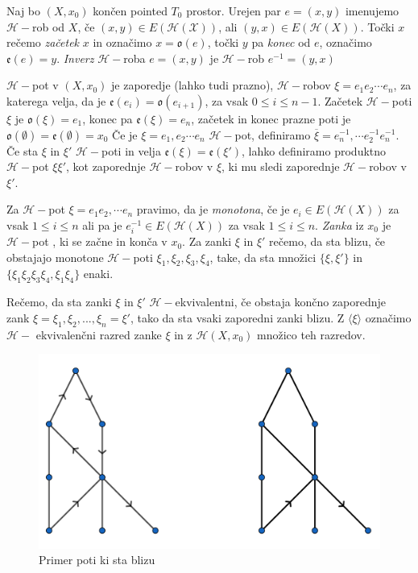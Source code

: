 \documentclass[mat1]{fmfdelo}
\DeclareRobustCommand{\h}{
    \mathcal{H}
}
\DeclareRobustCommand{\pot}{
    $\h-$pot
}
\begin{document}
\begin{definicija}
    Naj bo $(X,x_0)$ končen pointed $T_0$ prostor. Urejen par 
$e=(x,y)$ imenujemo $\mathcal{H}-$rob od $X$, če $(x,y)\in 
E(\mathcal{H}(\mathcal{X}))$, ali $(y,x)\in 
E(\h(X))$. Točki $x$ rečemo \textit{začetek} $x$ in označimo 
$x=\mathfrak{o}(e)$, točki $y$ pa \textit{konec} od $e$, 
označimo $\mathfrak{e}(e)=y$. \textit{Inverz} $\h-$roba $e=(x,y)$ je $\h-$rob $e^{-1}=(y,x)$

$\h-$pot v $(X,x_0)$ je zaporedje (lahko tudi prazno), $\h-$robov $\xi=e_1e_2\cdots e_n$, 
za katerega velja, da je $\mathfrak{e}(e_i)=\mathfrak{o}(e_{i+1})$, za vsak $0\leq i \leq n-1$.
 Začetek $\h-$poti $\xi$ je  $\mathfrak{o}(\xi)=e_1$, konec pa $\mathfrak{e}(\xi)=e_n$, 
 začetek in konec prazne poti je $\mathfrak{o}(\emptyset)=\mathfrak{e}(\emptyset)=x_0$
 Če je $\xi=e_1,e_2\cdots e_n$ $\h-$pot, definiramo $\overline{\xi}=e_n^{-1},\cdots 
 e_2^{-1}e_n^{-1}$. Če sta $\xi$ in $\xi'$ $\h-$poti in velja $\mathfrak{e}(\xi)=
 \mathfrak{e}(\xi')$, lahko definiramo produktno \pot $\xi\xi'$, kot zaporednje 
 $\h-$robov v $\xi$, ki mu sledi zaporednje $\h-$robov v $\xi'$.

 Za \pot $\xi=e_1e_2,\cdots e_n$ pravimo, da je \textit{monotona}, če je $e_i\in 
 E(\h(X))$ za vsak $1\leq i \leq n$ ali pa je $e_i^{-1}\in E(\h(X))$ za vsak $1\leq i \leq n$.
 \textit{Zanka} iz $x_0$ je \pot, ki se začne in konča v $x_0$. Za zanki $\xi$ in
  $\xi'$ rečemo, da sta blizu, če obstajajo monotone $\h-$poti $\xi_1,\xi_2,\xi_3,\xi_4$,
   take, da  sta množici $\{\xi,\xi'\}$ in $\{\xi_1\xi_2\xi_3\xi_4,\xi_1\xi_4\}$ enaki.

   Rečemo, da sta zanki $\xi$ in $\xi'$ $\h-$ekvivalentni, če obstaja končno zaporednje zank $\xi=\xi_1,\xi_2,...,\xi_n=\xi'$, tako da sta vsaki zaporedni zanki blizu. Z $\langle\xi\rangle$ označimo $\h-$ ekvivalenčni razred zanke $\xi$ in z $\mathscr{H}(X,x_0)$ množico teh razredov.
\end{definicija}

    \begin{figure}[h!]
          \centering
          \includegraphics[width=0.6\linewidth]{poti.png}
        \caption{Primer poti ki sta blizu}
        \end{figure}
\end{document}
